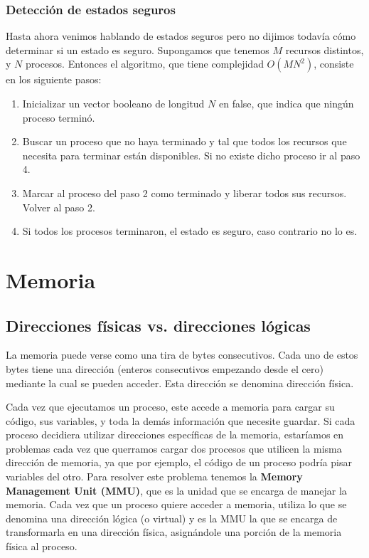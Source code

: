 \documentclass{article}
\begin{document}
\subsubsection{Detecci\'on de estados seguros}

Hasta ahora venimos hablando de estados seguros pero no dijimos todav\'ia c\'omo determinar si un estado es seguro. Supongamos que tenemos $M$ recursos distintos, y $N$ procesos. Entonces el algoritmo, que tiene complejidad $O(MN^2)$, consiste en los siguiente pasos:

\begin{enumerate}
\item Inicializar un vector booleano de longitud $N$ en false, que indica que ning\'un proceso termin\'o.
\item Buscar un proceso que no haya terminado y tal que todos los recursos que necesita para terminar est\'an disponibles. Si no existe dicho proceso ir al paso 4.
\item Marcar al proceso del paso 2 como terminado y liberar todos sus recursos. Volver al paso 2.
\item Si todos los procesos terminaron, el estado es seguro, caso contrario no lo es.
\end{enumerate}

\section{Memoria}

\subsection{Direcciones f\'isicas vs. direcciones l\'ogicas}

La memoria puede verse como una tira de bytes consecutivos. Cada uno de estos bytes tiene una direcci\'on (enteros consecutivos empezando desde el cero) mediante la cual se pueden acceder. Esta direcci\'on se denomina direcci\'on f\'isica.

Cada vez que ejecutamos un proceso, este accede a memoria para cargar su c\'odigo, sus variables, y toda la dem\'as informaci\'on que necesite guardar. Si cada proceso decidiera utilizar direcciones espec\'ificas de la memoria, estar\'iamos en problemas cada vez que querramos cargar dos procesos que utilicen la misma direcci\'on de memoria, ya que por ejemplo, el c\'odigo de un proceso podr\'ia pisar variables del otro. Para resolver este problema tenemos la \textbf{Memory Management Unit (MMU)}, que es la unidad que se encarga de manejar la memoria. Cada vez que un proceso quiere acceder a memoria, utiliza lo que se denomina una direcci\'on l\'ogica (o virtual) y es la MMU la que se encarga de transformarla en una direcci\'on f\'isica, asign\'andole una porci\'on de la memoria f\'isica al proceso.
\end{document}
